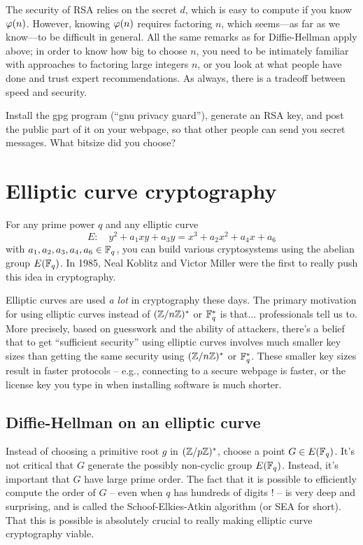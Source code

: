 \documentclass{book}
\begin{document}
The security of RSA relies on the secret $d$, which is easy
to compute if you know $\varphi(n)$.  However, knowing $\varphi(n)$
requires factoring $n$, which seems---as far as we know---to
be difficult in general.   All the same remarks as for Diffie-Hellman
apply above; in order to know how big to choose $n$, you need
to be intimately familiar with approaches to factoring large integers
$n$, or you look at what people have done and trust expert recommendations.
As always, there is a tradeoff between speed and security.

\begin{exercise}
Install the gpg program (``gnu privacy guard''), generate an RSA
key, and post the public part of it on your webpage, so that other
people can send you secret messages.  What bitsize did you choose?
\end{exercise}

\section{Elliptic curve cryptography}

For any prime power $q$ and any elliptic curve
$$
E: \quad y^2 + a_1 xy + a_3y = x^3 + a_2 x^2 + a_4 x + a_6
$$
with $a_1, a_2, a_3, a_4, a_6 \in \mathbb{F}_q$,
you can build various cryptosystems
using the abelian group $E(\mathbb{F}_q)$.
In 1985, Neal Koblitz and Victor Miller were the first to really
push this idea in cryptography.

Elliptic curves are used {\em a lot} in cryptography
these days.  The primary motivation for using elliptic curves
instead of $(\mathbb{Z}/n\mathbb{Z})^*$ or $\mathbb{F}_q^*$ is that... professionals
tell us to.  More precisely, based on guesswork and
the ability of attackers, there's a belief that to get
``sufficient security'' using elliptic curves involves
much smaller key sizes than getting the same security
using $(\mathbb{Z}/n\mathbb{Z})^*$ or $\mathbb{F}_q^*$.  These smaller key sizes
result in faster protocols -- e.g., connecting to a secure
webpage is faster, or the license key you
type in when installing software is much shorter.

\subsection{Diffie-Hellman on an elliptic curve}
Instead of choosing a primitive root $g$ in $(\mathbb{Z}/p\mathbb{Z})^*$,
choose a point $G \in E(\mathbb{F}_q)$.  It's not critical that
$G$ generate the possibly non-cyclic group $E(\mathbb{F}_q)$.
Instead, it's important that $G$ have large prime order.
The fact that it is possible to efficiently compute the
order of $G$ -- even when $q$ has hundreds of digits ! --
is very deep and surprising, and is called the
Schoof-Elkies-Atkin algorithm (or SEA for short).
That this is possible is absolutely crucial to really
making elliptic curve cryptography viable.
\end{document}
